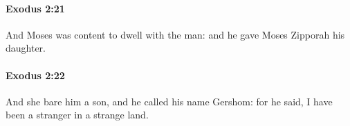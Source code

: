 		\paragraph{Exodus 2:21} %
			\label{EXODUS-2-21}

			And Moses was content to dwell with the man: and he gave Moses Zipporah his daughter.


		\paragraph{Exodus 2:22} %
			\label{EXODUS-2-22}

			And she bare him a son, and he called his name Gershom: for he said, I have been a stranger in a strange land.


